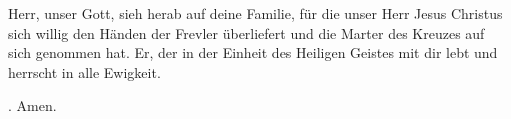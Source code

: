 \lettrine[lines=3]{H}{}err, unser Gott, sieh herab auf deine Familie, für die unser Herr Jesus Christus sich willig den Händen der Frevler überliefert und die Marter des Kreuzes auf sich genommen hat. Er, der in der Einheit des Heiligen Geistes mit dir lebt und herrscht in alle Ewigkeit.
\par \Rbar. Amen.
